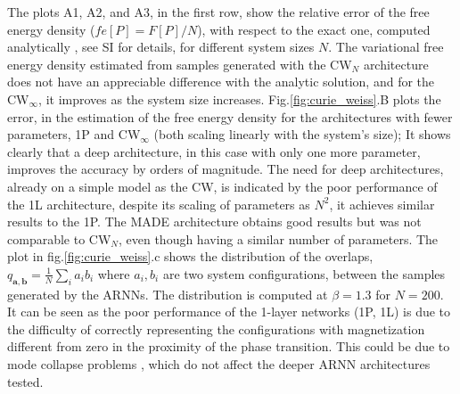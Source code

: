 \documentclass[aps,physrev,10pt,floatfix,reprint]{revtex4-2}
\begin{document}
The plots A1, A2, and A3, in the first row, show the relative error of the free energy density ($fe[P] = F[P]/N$), with respect to the exact one, computed analytically \cite{kadanoff2000statistical}, see SI for details, for different system sizes $N$.  
The variational free energy density estimated from samples generated with the CW$_N$ architecture does not have an appreciable difference with the analytic solution, and for the CW$_{\infty}$, it improves as the system size increases. Fig.\ref{fig:curie_weiss}.B plots the error, in the estimation of the free energy density for the architectures with fewer parameters, 1P and CW$_{\infty}$ (both scaling linearly with the system's size); It shows clearly that a deep architecture, in this case with only one more parameter, improves the accuracy by orders of magnitude. The need for deep architectures, already on a simple model as the CW, is indicated by the poor performance of the 1L architecture, despite its scaling of parameters as $N^2$, it achieves similar results to the 1P. The MADE architecture obtains good results but was not comparable to CW$_N$, even though having a similar number of parameters. The plot in fig.\ref{fig:curie_weiss}.c shows the distribution of the overlaps, $q_{\mathbf{a}, \mathbf{b}}=\frac{1}{N}\sum_{i} a_i b_i$ where $a_i, b_i$ are two system configurations, between the samples generated by the ARNNs. The distribution is computed at $\beta=1.3$ for $N=200$. It can be seen as the poor performance of the 1-layer networks (1P, 1L) is due to the difficulty of correctly representing the configurations with magnetization different from zero in the proximity of the phase transition. This could be due to mode collapse problems \cite{https://doi.org/10.48550/arxiv.2210.11145}, which do not affect the deeper ARNN architectures tested.
\end{document}
